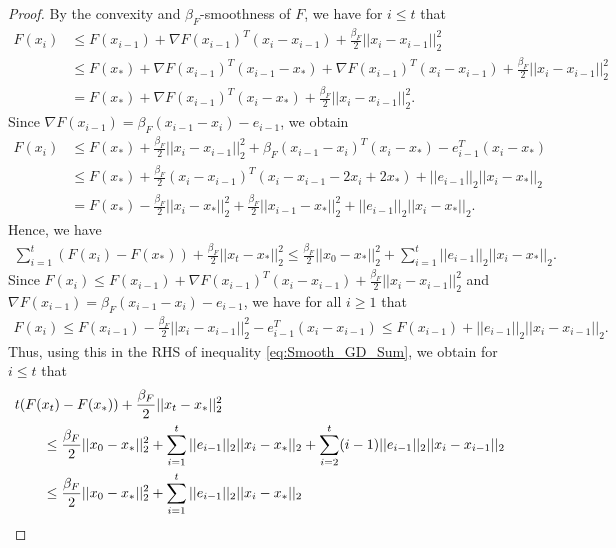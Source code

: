 \documentclass{article}
\begin{document}
\begin{proof}
By the convexity and $\beta_F$-smoothness of $F$, we have for $i \leq t$ that
\begin{align*}
F(x_i) &\leq F(x_{i - 1}) + \nabla F(x_{i - 1})^T(x_i - x_{i - 1}) + \frac{\beta_F}{2}||x_i - x_{i - 1}||_2^2\\
&\leq F(x_*) + \nabla F(x_{i - 1})^T(x_{i - 1} - x_*) + \nabla F(x_{i - 1})^T(x_i - x_{i - 1}) + \frac{\beta_F}{2}||x_i - x_{i - 1}||_2^2\\
&= F(x_*) + \nabla F(x_{i - 1})^T(x_i - x_*) + \frac{\beta_F}{2}||x_i - x_{i - 1}||_2^2.
\end{align*}
Since $\nabla F(x_{i - 1}) = \beta_F(x_{i - 1} - x_i) - e_{i - 1}$, we obtain
\begin{align*}
F(x_i) &\leq F(x_*) + \frac{\beta_F}{2}||x_i - x_{i - 1}||_2^2 + \beta_F(x_{i - 1} - x_i)^T(x_i - x_*) - e_{i - 1}^T(x_i - x_*)\\
& \leq F(x_*) + \frac{\beta_F}{2}(x_i - x_{i - 1})^T(x_i - x_{i - 1} - 2x_i + 2x_*) + ||e_{i - 1}||_2||x_i - x_*||_2\\
&= F(x_*) - \frac{\beta_F}{2}||x_i - x_*||_2^2 + \frac{\beta_F}{2}||x_{i - 1} - x_*||_2^2 + ||e_{i - 1}||_2||x_i - x_*||_2.
\end{align*}
Hence, we have
\begin{align}
\label{eq:Smooth_GD_Sum}
\sum_{i = 1}^t(F(x_i) - F(x_*)) + \frac{\beta_F}{2}||x_t - x_*||_2^2 \leq \frac{\beta_F}{2}||x_0 - x_*||_2^2 + \sum_{i = 1}^t||e_{i - 1}||_2||x_i - x_*||_2.
\end{align}
Since $F(x_i) \leq F(x_{i - 1}) + \nabla F(x_{i - 1})^T(x_i - x_{i - 1}) + \frac{\beta_F}{2}||x_i - x_{i - 1}||_2^2$ and $\nabla F(x_{i - 1}) = \beta_F(x_{i - 1} - x_i) - e_{i - 1}$, we have for all $i \geq 1$ that
\begin{align*}
F(x_i) \leq F(x_{i - 1}) - \frac{\beta_F}{2}||x_i - x_{i - 1}||_2^2 -e_{i - 1}^T(x_i - x_{i - 1}) \leq F(x_{i - 1}) + ||e_{i - 1}||_2||x_i - x_{i - 1}||_2.
\end{align*}
Thus, using this in the RHS of inequality \eqref{eq:Smooth_GD_Sum}, we obtain for $i \leq t$ that
\begin{align}
\label{eq:Smooth_GD_Sum2}
& t(F(x_t) - F(x_*)) + \frac{\beta_F}{2}||x_t - x_*||_2^2 \notag\\
%
& \qquad \leq \frac{\beta_F}{2}||x_0 - x_*||_2^2 + \sum_{i = 1}^t||e_{i - 1}||_2||x_i - x_*||_2 + \sum_{i = 2}^t(i - 1)||e_{i - 1}||_2||x_i - x_{i - 1}||_2 \notag\\
& \qquad \leq \frac{\beta_F}{2}||x_0 - x_*||_2^2 + \sum_{i = 1}^t||e_{i - 1}||_2||x_i - x_*||_2 \notag\\

\end{align}
\end{proof}
\end{document}
